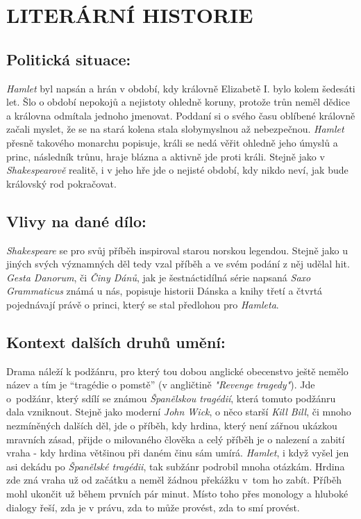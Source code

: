 \documentclass[A4paper]{extarticle} %
\begin{document}
\section*{LITERÁRNÍ HISTORIE}

\subsection*{Politická situace:}
\noindent
\textit{Hamlet} byl napsán a hrán v období, kdy královně Elizabetě I. bylo kolem šedesáti let.
Šlo o období nepokojů a nejistoty ohledně koruny, protože trůn neměl dědice a královna odmítala jednoho jmenovat.
Poddaní si o svého času oblíbené královně začali myslet, že se na stará kolena stala slobymyslnou až nebezpečnou.
\textit{Hamlet} přesně takového monarchu popisuje, králi se nedá věřit ohledně jeho úmyslů a princ, následník trůnu, hraje blázna a aktivně jde proti králi.
Stejně jako v \textit{Shakespearově} realitě, i v jeho hře jde o nejisté období, kdy nikdo neví, jak bude královský rod pokračovat.

\subsection*{Vlivy na dané dílo:}
\noindent
\textit{Shakespeare} se pro svůj příběh inspiroval starou norskou legendou.
Stejně jako u jiných svých významných děl tedy vzal příběh a ve svém podání z něj udělal hit.
\textit{Gesta Danorum}, či \textit{Činy Dánů}, jak je šestnáctidílná série napsaná \textit{Saxo Grammaticus} známá u nás, popisuje historii Dánska a knihy třetí a čtvrtá pojednávají právě o princi, který se stal předlohou pro \textit{Hamleta}.

\subsection*{Kontext dalších druhů umění:}
\noindent
Drama náleží k podžánru, pro který tou dobou anglické obecenstvo ještě nemělo název a tím je \enquote{tragédie o pomstě} (v angličtině \textit{"Revenge tragedy"}).
Jde o~podžánr, který sdílí se známou \textit{Španělskou tragédií}, která tomuto podžánru dala vzniknout.
Stejně jako moderní \textit{John Wick}, o něco starší \textit{Kill Bill}, či mnoho nezmíněných dalších děl, jde o příběh, kdy hrdina, který není zářnou ukázkou mravních zásad, přijde o milovaného člověka a celý příběh je o nalezení a zabití vraha - kdy hrdina většinou při daném činu sám umírá.
\textit{Hamlet}, i když vyšel jen asi dekádu po \textit{Španělské tragédii}, tak subžánr podrobil mnoha otázkám.
Hrdina zde zná vraha už od začátku a neměl žádnou překážku v~tom ho zabít.
Příběh mohl ukončit už během prvních pár minut.
Místo toho přes monology a hluboké dialogy řeší, zda je v právu, zda to může provést, zda to smí provést.
\end{document}
